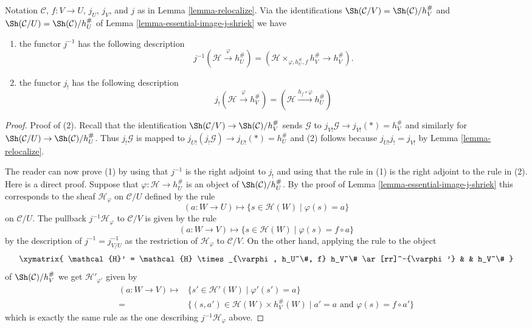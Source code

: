 \begin{lemma}
\label{lemma-relocalize-explicit}
Notation $\mathcal{C}$, $f : V \to U$, $j_U$, $j_V$, and $j$ as in
Lemma \ref{lemma-relocalize}. Via the identifications
$\Sh(\mathcal{C}/V) = \Sh(\mathcal{C})/h_V^\#$
and
$\Sh(\mathcal{C}/U) = \Sh(\mathcal{C})/h_U^\#$
of
Lemma \ref{lemma-essential-image-j-shriek}
we have
\begin{enumerate}
\item the functor $j^{-1}$ has the following description
$$
j^{-1}(\mathcal{H} \xrightarrow{\varphi} h_U^\#)
=
(\mathcal{H} \times_{\varphi, h_U^\#, f} h_V^\# \to h_V^\#).
$$
\item the functor $j_!$ has the following description
$$
j_!(\mathcal{H} \xrightarrow{\varphi} h_V^\#) =
(\mathcal{H} \xrightarrow{h_f \circ \varphi} h_U^\#)
$$
\end{enumerate}
\end{lemma}

\begin{proof}
Proof of (2). Recall that the identification
$\Sh(\mathcal{C}/V) \to \Sh(\mathcal{C})/h_V^\#$
sends $\mathcal{G}$ to $j_{V!}\mathcal{G} \to j_{V!}(*) = h_V^\#$
and similarly for
$\Sh(\mathcal{C}/U) \to \Sh(\mathcal{C})/h_U^\#$.
Thus $j_!\mathcal{G}$ is mapped to
$j_{U!}(j_!\mathcal{G}) \to j_{U!}(*) = h_U^\#$
and (2) follows because $j_{U!}j_! = j_{V!}$
by Lemma \ref{lemma-relocalize}.

\medskip\noindent
The reader can now prove (1) by using that $j^{-1}$ is the
right adjoint to $j_!$ and using that the rule in (1)
is the right adjoint to the rule in (2). Here is a direct proof.
Suppose that $\varphi : \mathcal{H} \to h_U^\#$ is an object of
$\Sh(\mathcal{C})/h_U^\#$. By the proof of
Lemma \ref{lemma-essential-image-j-shriek}
this corresponds to the sheaf
$\mathcal{H}_\varphi$ on $\mathcal{C}/U$ defined by the rule
$$
(a : W \to U)
\longmapsto
\{ s \in \mathcal{H}(W) \mid \varphi(s) = a\}
$$
on $\mathcal{C}/U$. The pullback $j^{-1}\mathcal{H}_\varphi$ to
$\mathcal{C}/V$ is given by the rule
$$
(a : W \to V)
\longmapsto
\{ s \in \mathcal{H}(W) \mid \varphi(s) = f \circ a\}
$$
by the description of $j^{-1} = j_{V/U}^{-1}$ as the restriction
of $\mathcal{H}_\varphi$ to $\mathcal{C}/V$.
On the other hand, applying the rule to the object
$$
\xymatrix{
\mathcal{H}' = \mathcal{H} \times_{\varphi, h_U^\#, f} h_V^\#
\ar[rr]^-{\varphi'} & & h_V^\#
}
$$
of $\Sh(\mathcal{C})/h_V^\#$
we get $\mathcal{H}'_{\varphi'}$
given by
\begin{align*}
(a : W \to V)
\longmapsto
&  \{ s' \in \mathcal{H}'(W) \mid \varphi'(s') = a\} \\
= &
\{ (s, a') \in \mathcal{H}(W) \times h_V^\#(W) \mid
a' = a \text{ and } \varphi(s) = f \circ a'\}
\end{align*}
which is exactly the same rule as the one describing
$j^{-1}\mathcal{H}_\varphi$ above.
\end{proof}

